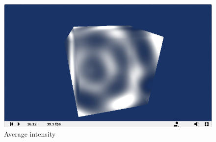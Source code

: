 \documentclass[a4paper]{article}
\begin{document}
\begin{figure}[!ht]
	\centering
	\includegraphics[width=0.62\linewidth]{3}
	\caption{Average intensity}
	\label{fig:3}
\end{figure}
\end{document}
